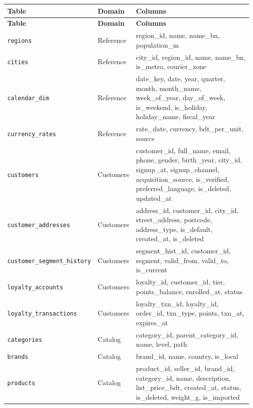 \documentclass[11pt,a4paper]{article}
\newcommand{\code}[1]{\texttt{\small #1}}
\begin{document}
{\small
\begin{longtable}{@{}l l >{\raggedright\arraybackslash}p{9.3cm}@{}}
\toprule
\textbf{Table} & \textbf{Domain} & \textbf{Columns}\\
\midrule
\endfirsthead
\toprule
\textbf{Table} & \textbf{Domain} & \textbf{Columns}\\
\midrule
\endhead
\code{regions} & Reference & \footnotesize\ttfamily region\_id, name, name\_bn, population\_m\\
\code{cities} & Reference & \footnotesize\ttfamily city\_id, region\_id, name, name\_bn, is\_metro, courier\_zone\\
\code{calendar\_dim} & Reference & \footnotesize\ttfamily date\_key, date, year, quarter, month, month\_name, week\_of\_year, day\_of\_week, is\_weekend, is\_holiday, holiday\_name, fiscal\_year\\
\code{currency\_rates} & Reference & \footnotesize\ttfamily rate\_date, currency, bdt\_per\_unit, source\\
\code{customers} & Customers & \footnotesize\ttfamily customer\_id, \textcolor{bad}{full\_name}, \textcolor{bad}{email}, \textcolor{bad}{phone}, gender, birth\_year, city\_id, signup\_at, signup\_channel, acquisition\_source, is\_verified, preferred\_language, is\_deleted, updated\_at\\
\code{customer\_addresses} & Customers & \footnotesize\ttfamily address\_id, customer\_id, city\_id, \textcolor{bad}{street\_address}, \textcolor{bad}{postcode}, address\_type, is\_default, created\_at, is\_deleted\\
\code{customer\_segment\_history} & Customers & \footnotesize\ttfamily segment\_hist\_id, customer\_id, segment, valid\_from, valid\_to, is\_current\\
\code{loyalty\_accounts} & Customers & \footnotesize\ttfamily loyalty\_id, customer\_id, tier, points\_balance, enrolled\_at, status\\
\code{loyalty\_transactions} & Customers & \footnotesize\ttfamily loyalty\_txn\_id, loyalty\_id, order\_id, txn\_type, points, txn\_at, expires\_at\\
\code{categories} & Catalog & \footnotesize\ttfamily category\_id, parent\_category\_id, name, level, path\\
\code{brands} & Catalog & \footnotesize\ttfamily brand\_id, name, country, is\_local\\
\code{products} & Catalog & \footnotesize\ttfamily product\_id, seller\_id, brand\_id, category\_id, name, description, list\_price\_bdt, created\_at, status, is\_deleted, weight\_g, is\_imported\\

\end{longtable}}
\end{document}

